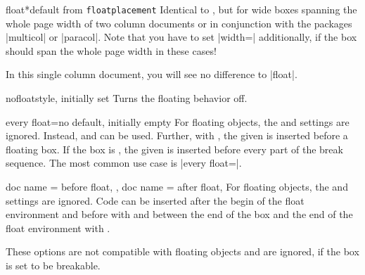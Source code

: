 \begin{docTcbKey}{float*}{}{default from \texttt{floatplacement}}
  Identical to , but for wide boxes spanning the whole page
  width of two column documents or in conjunction with the packages
  |multicol| or |paracol|. Note that you have to set |width=\textwidth|
  additionally, if the box should span the whole page width in these cases!
\begin{dispListing}
\begin{tcolorbox}[float*=b, title=Floating box from |float*|,width=\textwidth,
    enhanced,watermark text={I'm also floating}]
  In this single column document, you will see no difference to |float|.
\end{tcolorbox}
\end{dispListing}
\end{docTcbKey}
{\tcbusetemp}


\begin{docTcbKey}{nofloat}{}{style, initially set}
  Turns the floating behavior off.
\end{docTcbKey}


\begin{docTcbKey}[][doc new=2014-09-19]{every float}{=}{no default, initially empty}
  For floating objects, the  and 
  settings are ignored. Instead,  and 
  can be used. Further, with , the given  is inserted before
  a floating box. If the box is , the given  is
  inserted before every part of the break sequence.
  The most common use case is |every float=\centering|.

\begin{dispListing}
\end{dispListing}
{\tcbusetemp}

\end{docTcbKey}


\begin{docTcbKeys}[
    doc parameter   = {=\marg{code}},
    doc description = {no default, initially empty},
    doc new         = 2022-06-21,
  ]
  {
    {
      doc name        = before float,
    },
    {
      doc name        = after float,
    }
  }
  For floating objects, the  and 
  settings are ignored. Code can be inserted after the begin of the float
  environment and before  with
   and between the end of the box and the end
  of the float environment with .
  \begin{marker}
  These options are not compatible with  floating objects
  and are ignored, if the box is set to be breakable.
  \end{marker}
\end{docTcbKeys}




